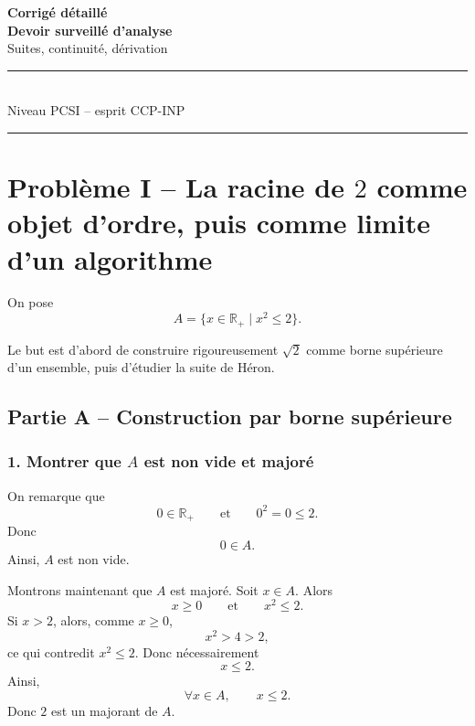 \documentclass[11pt,a4paper]{article}
\newcommand{\R}{\mathbb{R}}
\begin{document}
\begin{center}
    {\Huge \bfseries Corrigé détaillé}\\[0.3cm]
    {\Large \bfseries Devoir surveillé d'analyse}\\[0.2cm]
    {\large Suites, continuité, dérivation}\\[0.4cm]
    \rule{0.85\linewidth}{0.5pt}\\[0.2cm]
    {\large Niveau PCSI -- esprit CCP-INP}\\[0.2cm]
    \rule{0.85\linewidth}{0.5pt}
\end{center}

\vspace{0.4cm}



\newpage


\section*{Problème I -- La racine de \(2\) comme objet d'ordre, puis comme limite d'un algorithme}

On pose
\[
A=\{x\in\R_+ \mid x^2\leq 2\}.
\]

Le but est d'abord de construire rigoureusement \(\sqrt2\) comme borne supérieure d'un ensemble, puis d'étudier la suite de Héron.


\subsection*{Partie A -- Construction par borne supérieure}

\subsubsection*{1. Montrer que \(A\) est non vide et majoré}

On remarque que
\[
0\in\R_+
\qquad\text{et}\qquad
0^2=0\leq 2.
\]
Donc
\[
0\in A.
\]
Ainsi, \(A\) est non vide.

Montrons maintenant que \(A\) est majoré. Soit \(x\in A\). Alors
\[
x\geq 0
\qquad\text{et}\qquad
x^2\leq 2.
\]
Si \(x>2\), alors, comme \(x\geq 0\),
\[
x^2>4>2,
\]
ce qui contredit \(x^2\leq 2\). Donc nécessairement
\[
x\leq 2.
\]
Ainsi,
\[
\forall x\in A,\qquad x\leq 2.
\]
Donc \(2\) est un majorant de \(A\).
\end{document}
